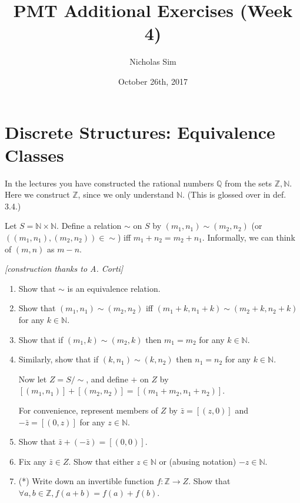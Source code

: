 \documentclass[10pt,a4paper]{article}
\begin{document}
\title{PMT Additional Exercises (Week 4)}
\author{Nicholas Sim}
\date{October 26th, 2017}
\maketitle{}


\section{Discrete Structures: Equivalence Classes}

In the lectures you have constructed the rational numbers 
\( \mathbb{Q} \) from the sets \( \mathbb{Z}, \mathbb{N} \).
Here we construct \( \mathbb{Z} \), since we only understand 
\( \mathbb{N} \). (This is glossed over in def. 3.4.)

Let \( S = \mathbb{N} \times \mathbb{N} \). 
Define a relation \( \sim \) on \( S \) by \( (m_1, n_1) \sim (m_2, n_2) \) 
(or \( \left( (m_1, n_1), (m_2, n_2) \right) \in \sim \))
iff \( m_1 + n_2 = m_2 + n_1 \).
Informally, we can think of \( (m, n) \) as \( m - n \).

\emph{[construction thanks to A. Corti]}

\begin{enumerate}
    \item Show that \( \sim \) is an equivalence relation.
    \item Show that \( (m_1, n_1) \sim (m_2, n_2) \) iff 
    \( (m_1 + k, n_1 + k) \sim (m_2 + k, n_2 + k) \) 
    for any \( k \in \mathbb{N} \).
    \item Show that if \( (m_1, k) \sim (m_2, k) \) then 
    \( m_1 = m_2 \) 
    for any \( k \in \mathbb{N} \).
    \item Similarly, show that if \( (k, n_1) \sim (k, n_2) \) then 
    \( n_1 = n_2 \) 
    for any \( k \in \mathbb{N} \).

    Now let \( Z = S / \sim \), and define \( + \) on \( Z \) by 
    \( [(m_1, n_1)] + [(m_2, n_2)] = [(m_1 + m_2, n_1 + n_2)] \).
    
    For convenience, represent members of \( Z \) by 
    \( \bar{z} = [(z, 0)] \) and \( -\bar{z} = [(0, z)] \)
    for any \( z \in \mathbb{N} \).

    \item Show that \( \bar{z} + (-\bar{z}) = [(0, 0)] \).
    \item Fix any \( \bar{z} \in Z \). 
    Show that either \( z \in \mathbb{N} \) or (abusing notation) 
    \( -z \in \mathbb{N} \).
    \item (*) Write down an invertible function 
    \( f : \mathbb{Z} \rightarrow Z \).
    Show that \( \forall a, b \in \mathbb{Z}, f (a + b) = f(a) + f(b) \).
\end{enumerate}
\end{document}
